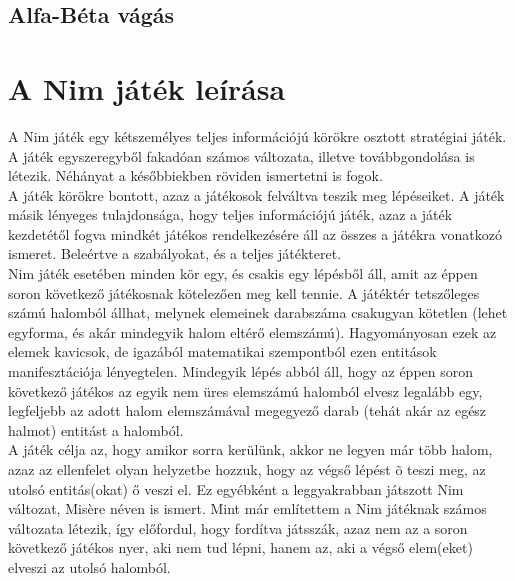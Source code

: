 \subsection{Alfa-Béta vágás}


\section{A Nim játék leírása}
A Nim játék egy kétszemélyes teljes információjú körökre osztott stratégiai játék. A játék egyszeregyből fakadóan számos változata, illetve továbbgondolása is létezik. Néhányat a későbbiekben röviden ismertetni is fogok. \\

A játék körökre bontott, azaz a játékosok felváltva teszik meg lépéseiket. A játék másik lényeges tulajdonsága, hogy teljes információjú játék, azaz a játék kezdetétől fogva mindkét játékos rendelkezésére áll az összes a játékra vonatkozó ismeret. Beleértve a szabályokat, és a teljes játékteret.\\

Nim játék esetében minden kör egy, és csakis egy lépésből áll, amit az éppen soron következő játékosnak kötelezően meg kell tennie. A játéktér tetszőleges számú halomból állhat, melynek elemeinek darabszáma csakugyan kötetlen (lehet egyforma, és akár mindegyik halom eltérő elemszámú). Hagyományosan ezek az elemek kavicsok, de igazából matematikai szempontból ezen entitások manifesztációja lényegtelen. Mindegyik lépés abból áll, hogy az éppen soron következő játékos az egyik nem üres elemszámú halomból elvesz legalább egy, legfeljebb az adott halom elemszámával megegyező darab (tehát akár az egész halmot) entitást a halomból.\\

A játék célja az, hogy amikor sorra kerülünk, akkor ne legyen már több halom, azaz az ellenfelet olyan helyzetbe hozzuk, hogy az végső lépést õ teszi meg, az utolsó entitás(okat) ő veszi el. Ez egyébként a leggyakrabban játszott Nim változat, Misère néven is ismert. Mint már említettem a Nim játéknak számos változata létezik, így előfordul, hogy fordítva játsszák, azaz nem az a soron következő játékos nyer, aki nem tud lépni, hanem az, aki a végső elem(eket) elveszi az utolsó halomból.\\


